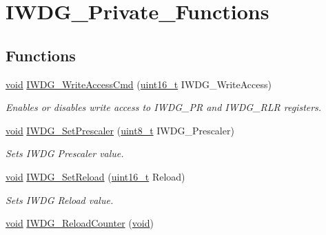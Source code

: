 \hypertarget{group___i_w_d_g___private___functions}{}\section{I\+W\+D\+G\+\_\+\+Private\+\_\+\+Functions}
\label{group___i_w_d_g___private___functions}
\subsection*{Functions}
\begin{DoxyCompactItemize}
\item 
\hyperlink{usb__devapi_8h_afabf60e7f57651d6d595a02c75f07cd0}{void} \hyperlink{group___i_w_d_g___private___functions_gae466681e5bdc11b353c508b89d75ca05}{I\+W\+D\+G\+\_\+\+Write\+Access\+Cmd} (\hyperlink{_p_e___types_8h_a1f1825b69244eb3ad2c7165ddc99c956}{uint16\+\_\+t} I\+W\+D\+G\+\_\+\+Write\+Access)
\begin{DoxyCompactList}\small\item\em Enables or disables write access to I\+W\+D\+G\+\_\+\+PR and I\+W\+D\+G\+\_\+\+R\+LR registers. \end{DoxyCompactList}\item 
\hyperlink{usb__devapi_8h_afabf60e7f57651d6d595a02c75f07cd0}{void} \hyperlink{group___i_w_d_g___private___functions_ga4fa7f1cd690533a35ad9e4729c0450a3}{I\+W\+D\+G\+\_\+\+Set\+Prescaler} (\hyperlink{_p_e___types_8h_aba7bc1797add20fe3efdf37ced1182c5}{uint8\+\_\+t} I\+W\+D\+G\+\_\+\+Prescaler)
\begin{DoxyCompactList}\small\item\em Sets I\+W\+DG Prescaler value. \end{DoxyCompactList}\item 
\hyperlink{usb__devapi_8h_afabf60e7f57651d6d595a02c75f07cd0}{void} \hyperlink{group___i_w_d_g___private___functions_gae2a14752a0431f23cb80cebf202ac365}{I\+W\+D\+G\+\_\+\+Set\+Reload} (\hyperlink{_p_e___types_8h_a1f1825b69244eb3ad2c7165ddc99c956}{uint16\+\_\+t} Reload)
\begin{DoxyCompactList}\small\item\em Sets I\+W\+DG Reload value. \end{DoxyCompactList}\item 
\hyperlink{usb__devapi_8h_afabf60e7f57651d6d595a02c75f07cd0}{void} \hyperlink{group___i_w_d_g___private___functions_ga7147ebabdc3fef97f532b171a4e70d49}{I\+W\+D\+G\+\_\+\+Reload\+Counter} (\hyperlink{usb__devapi_8h_afabf60e7f57651d6d595a02c75f07cd0}{void})

\end{DoxyCompactItemize}
